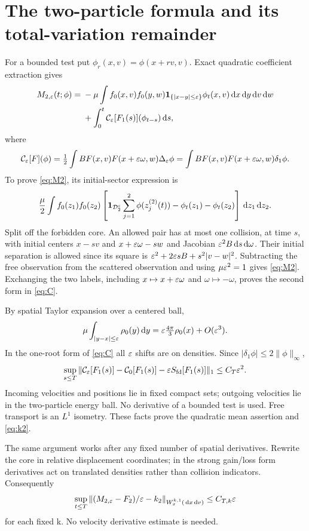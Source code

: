 \documentclass[11pt,letterpaper]{article}
\theoremstyle{remark}\newtheorem{remark}[theorem]{Remark}
\numberwithin{equation}{section}
\newcommand{\Sfd}{S_{\mathrm{fd}}}\newcommand{\U}{\mathcal U}\newcommand{\D}{\mathcal D}
\begin{document}
\section{The two-particle formula and its total-variation remainder}
For a bounded test put $\phi_r(x,v)=\phi(x+rv,v)$. Exact quadratic coefficient extraction gives
\begin{equation}\label{eq:M2}
 \begin{split}
 M_{2,\varepsilon}(t;\phi)={}&-\mu\int f_0(x,v)f_0(y,w)\mathbf1_{\{|x-y|\le\varepsilon\}}
                      \phi_t(x,v)\,\mathrm d x\,\mathrm d y\,\mathrm d v\,\mathrm d w\\
 &+\int_0^t\mathcal C_\varepsilon[F_1(s)](\phi_{t-s})\,\mathrm d s,
 \end{split}
\end{equation}
where
\begin{equation}\label{eq:C}
 \mathcal C_\varepsilon[F](\phi)=\tfrac12\int BF(x,v)F(x+\varepsilon\omega,w)\Delta_\varepsilon\phi
                       =\int BF(x,v)F(x+\varepsilon\omega,w)\delta_1\phi.
\end{equation}
To prove \eqref{eq:M2}, its initial-sector expression is
\[
 \frac\mu2\int f_0(z_1)f_0(z_2)
 \left[\ind_{\D_2^\eps}\sum_{j=1}^2\phi(z_j^{(2)}(t))
                     -\phi_t(z_1)-\phi_t(z_2)\right]\dd z_1\dd z_2.
\]
Split off the forbidden core. An allowed pair has at most one collision, at time $s$, with initial centers $x-sv$ and $x+\varepsilon\omega-sw$ and Jacobian $\varepsilon^2B\,\mathrm d s\,\mathrm d\omega$. Their initial separation is allowed since its square is $\varepsilon^2+2\varepsilon sB+s^2|v-w|^2$. Subtracting the free observation from the scattered observation and using $\mu\varepsilon^2=1$ gives \eqref{eq:M2}. Exchanging the two labels, including $x\mapsto x+\varepsilon\omega$ and $\omega\mapsto-\omega$, proves the second form in \eqref{eq:C}.

By spatial Taylor expansion over a centered ball,
\[
 \mu\int_{|y-x|\le\varepsilon}\rho_0(y)\,\mathrm d y
         =\varepsilon\tfrac{4\pi}{3}\rho_0(x)+O(\varepsilon^3).
\]
In the one-root form of \eqref{eq:C} all $\varepsilon$ shifts are on densities. Since $|\delta_1\phi|\le2\|\phi\|_\infty$,
\[
 \sup_{s\le T}\|\mathcal C_\eps[F_1(s)]-\mathcal C_0[F_1(s)]-\eps\Sfd[F_1(s)]\|_1
          \le C_T\eps^2.
\]
Incoming velocities and positions lie in fixed compact sets; outgoing velocities lie in the two-particle energy ball. No derivative of a bounded test is used. Free transport is an $L^1$ isometry. These facts prove the quadratic mean assertion and \eqref{eq:k2}.

The same argument works after any fixed number of spatial derivatives. Rewrite the core in relative displacement coordinates; in the strong gain/loss form derivatives act on translated densities rather than collision indicators. Consequently
\begin{equation}\label{eq:Wk}
 \sup_{t\le T}\|(M_{2,\varepsilon}-F_2)/\varepsilon-k_2\|_{W_x^{k,1}(\,\mathrm d x\,\mathrm d v)}
          \le C_{T,k}\varepsilon
\end{equation}
for each fixed k. No velocity derivative estimate is needed.
\end{document}
